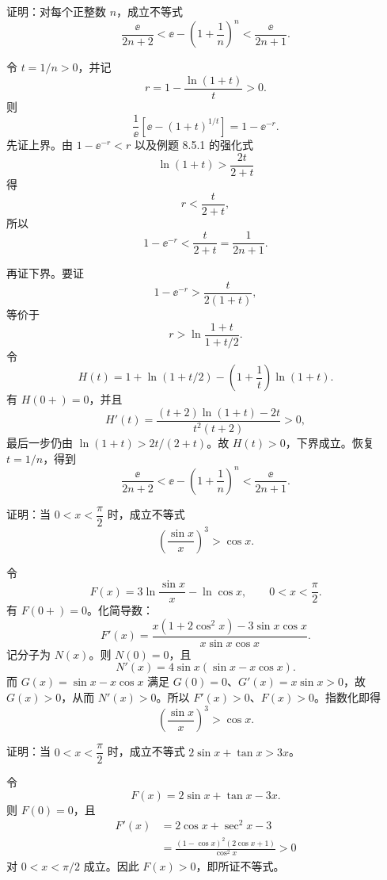 \begin{xreferenceproblem}[6]
证明：对每个正整数 $n$，成立不等式
  \[
    \frac{\ee}{2n+2}<\ee-\left(1+\frac1n\right)^n<\frac{\ee}{2n+1}.
  \]
\end{xreferenceproblem}
\begin{xsolution}
令 $t=1/n>0$，并记
\[
  r=1-\frac{\ln(1+t)}t>0.
\]
则
\[
  \frac1\ee\left[\ee-(1+t)^{1/t}\right]=1-\ee^{-r}.
\]
先证上界。由 $1-\ee^{-r}<r$ 以及例题 8.5.1 的强化式
\[
  \ln(1+t)>\frac{2t}{2+t}
\]
得
\[
  r<\frac{t}{2+t},
\]
所以
\[
  1-\ee^{-r}<\frac{t}{2+t}=\frac1{2n+1}.
\]

再证下界。要证
\[
  1-\ee^{-r}>\frac{t}{2(1+t)},
\]
等价于
\[
  r>\ln\frac{1+t}{1+t/2}.
\]
令
\[
  H(t)=1+\ln(1+t/2)-\left(1+\frac1t\right)\ln(1+t).
\]
有 $H(0+)=0$，并且
\[
  H'(t)=\frac{(t+2)\ln(1+t)-2t}{t^2(t+2)}>0,
\]
最后一步仍由 $\ln(1+t)>2t/(2+t)$。故 $H(t)>0$，下界成立。恢复 $t=1/n$，得到
\[
  \boxed{
  \frac{\ee}{2n+2}<\ee-\left(1+\frac1n\right)^n
  <\frac{\ee}{2n+1}}.
\]
\end{xsolution}


\begin{xreferenceproblem}[7]
证明：当 $0<x<\dfrac\pi2$ 时，成立不等式
  \[
    \left(\frac{\sin x}{x}\right)^3>\cos x.
  \]
\end{xreferenceproblem}
\begin{xsolution}
令
\[
  F(x)=3\ln\frac{\sin x}{x}-\ln\cos x,
  \qquad0<x<\frac\pi2.
\]
有 $F(0+)=0$。化简导数：
\[
  F'(x)=
  \frac{x(1+2\cos^2x)-3\sin x\cos x}{x\sin x\cos x}.
\]
记分子为 $N(x)$。则 $N(0)=0$，且
\[
  N'(x)=4\sin x(\sin x-x\cos x).
\]
而 $G(x)=\sin x-x\cos x$ 满足 $G(0)=0$、$G'(x)=x\sin x>0$，故 $G(x)>0$，从而 $N'(x)>0$。所以 $F'(x)>0$、$F(x)>0$。指数化即得
\[
  \left(\frac{\sin x}{x}\right)^3>\cos x.
\]
\end{xsolution}


\begin{xreferenceproblem}[8]
证明：当 $0<x<\dfrac\pi2$ 时，成立不等式 $2\sin x+\tan x>3x$。
\end{xreferenceproblem}
\begin{xsolution}
令
\[
  F(x)=2\sin x+\tan x-3x.
\]
则 $F(0)=0$，且
\begin{align*}
  F'(x)
  &=2\cos x+\operatorname{sec}^2x-3\\
  &=\frac{(1-\cos x)^2(2\cos x+1)}{\cos^2x}>0
\end{align*}
对 $0<x<\pi/2$ 成立。因此 $F(x)>0$，即所证不等式。
\end{xsolution}


